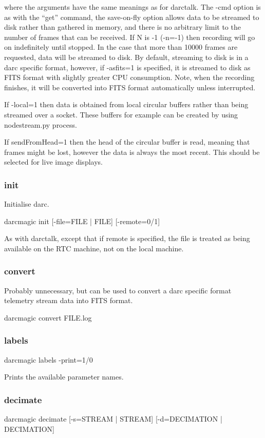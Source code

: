 \documentclass[a4,10pt]{article}
\begin{document}
where the arguments have the same meanings as for darctalk.  The -cmd
option is as with the ``get'' command, the save-on-fly option allows
data to be streamed to disk rather than gathered in memory, and there
is no arbitrary limit to the number of frames that can be received.
If N is -1 (-n=-1) then recording will go on indefinitely until
stopped.  In the case that more than 10000 frames are requested, data
will be streamed to disk.  By default, streaming to disk is in a darc
specific format, however, if -asfits=1 is specified, it is streamed to
disk as FITS format with slightly greater CPU consumption.  Note, when
the recording finishes, it will be converted into FITS format
automatically unless interrupted.

If -local=1 then data is obtained from local circular buffers rather
than being streamed over a socket.  These buffers for example can be
created by using nodestream.py process.

If sendFromHead=1 then the head of the circular buffer is read,
meaning that frames might be lost, however the data is always the most
recent.  This should be selected for live image displays.

\subsubsection{init}
Initialise darc.

darcmagic init [-file=FILE | FILE] [-remote=0/1]

As with darctalk, except that if remote is specified, the file is
treated as being available on the RTC machine, not on the local
machine.

\subsubsection{convert}
Probably unnecessary, but can be used to convert a darc specific
format telemetry stream data into FITS format.

darcmagic convert FILE.log


\subsubsection{labels}
darcmagic labels -print=1/0

Prints the available parameter names.

\subsubsection{decimate}
darcmagic decimate [-s=STREAM | STREAM] [-d=DECIMATION | DECIMATION]
\end{document}
